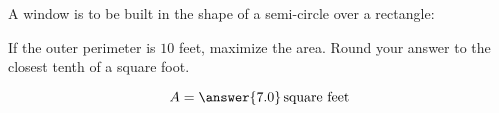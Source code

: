 \documentclass{ximera}
\author{Bart Snapp}
\begin{document}
\begin{exercise}

  A window is to be built in the shape of a semi-circle over a rectangle:
  \begin{image}
  \end{image}
  If the outer perimeter is $10$ feet, maximize the area. Round your answer to the closest tenth of a square foot.
  \begin{prompt}
  \[
  A = \answer{7.0}\,\text{square feet}
  \]
  \end{prompt}
\end{exercise}
\end{document}

